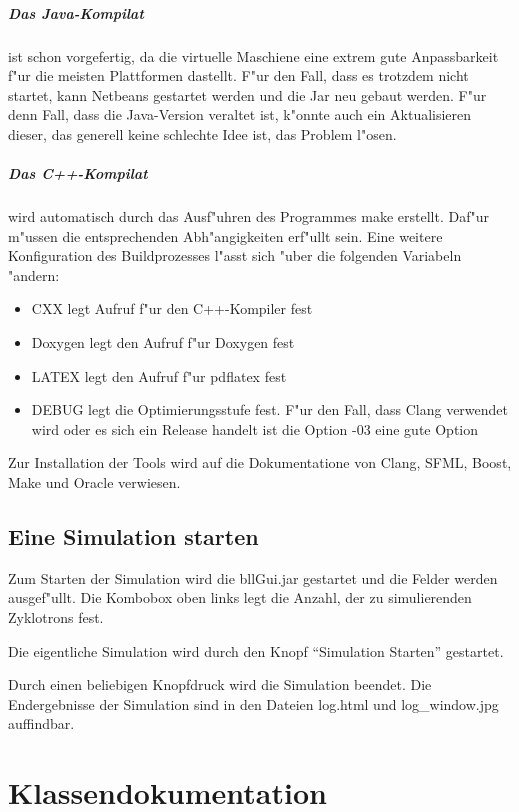 \documentclass[14pt, a4paper]{report}
\begin{document}
\paragraph{Das Java-Kompilat} ist schon vorgefertig, da die virtuelle Maschiene eine 
extrem gute Anpassbarkeit f"ur die meisten Plattformen dastellt. F"ur den Fall, dass es
trotzdem nicht startet, kann Netbeans gestartet werden und die Jar neu gebaut werden.
F"ur denn Fall, dass die Java-Version veraltet ist, k"onnte auch ein Aktualisieren 
dieser, das generell keine schlechte Idee ist, das Problem l"osen.

\paragraph{Das C++-Kompilat} wird automatisch durch das Ausf"uhren des Programmes make
erstellt. Daf"ur m"ussen die entsprechenden Abh"angigkeiten erf"ullt sein. Eine weitere
Konfiguration des Buildprozesses l"asst sich "uber die folgenden Variabeln "andern:
\begin{itemize}
\item CXX legt Aufruf f"ur den C++-Kompiler fest
\item Doxygen legt den Aufruf f"ur Doxygen fest
\item LATEX legt den Aufruf f"ur pdflatex fest 
\item DEBUG legt die Optimierungsstufe fest. F"ur den Fall, dass Clang verwendet wird 
oder es sich ein Release handelt ist die Option -03 eine gute Option
\end{itemize}
Zur Installation der Tools wird auf die Dokumentatione von Clang, SFML, Boost, Make und
Oracle verwiesen.

\section{Eine Simulation starten}
Zum Starten der Simulation wird die bllGui.jar gestartet und die Felder werden 
ausgef"ullt. Die Kombobox oben links legt die Anzahl, der zu simulierenden Zyklotrons 
fest.

Die eigentliche Simulation wird durch den Knopf "`Simulation Starten"' gestartet.

Durch einen beliebigen Knopfdruck wird die Simulation beendet. Die Endergebnisse der
Simulation sind in den Dateien log.html und log\_window.jpg auffindbar.

\chapter{Klassendokumentation}
\newpage
\end{document}
